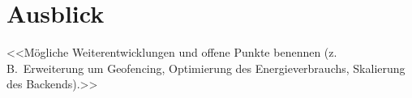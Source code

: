 \section{Ausblick}

<<Mögliche Weiterentwicklungen und offene Punkte benennen (z.\,B.\ Erweiterung
um Geofencing, Optimierung des Energieverbrauchs, Skalierung des Backends).>>
